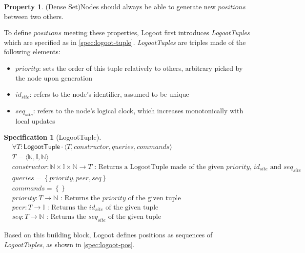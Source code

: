 \documentclass{article}
\newcommand{\commands}[1]{commands = \set{#1}}
\newcommand{\fnspec}[3]{#1: #2 \text{ : #3}}
\newcommand{\queries}[1]{queries = \set{#1}}
\newcommand{\set}[1]{\left\{#1\right\}} %
\newcommand{\spectuple}[1]{\tuple{#1, constructor, queries, commands}}
\newcommand{\tuple}[1]{\langle #1 \rangle}
\theoremstyle{definition}
\theoremstyle{definition}
\newcounter{property-counter}
\theoremstyle{definition}
\newtheorem{property}[property-counter]{Property}
\newcounter{specificationcounter}
\theoremstyle{definition}
\newtheorem{specification}[specificationcounter]{Specification}
\begin{document}
\begin{property}(Dense Set)\label{prop:dense-set}
    Nodes should always be able to generate new $positions$ between two others.
\end{property}

To define $positions$ meeting these properties, Logoot first introduces \emph{LogootTuples} which are specified as in \autoref{spec:logoot-tuple}.
\emph{LogootTuples} are triples made of the following elements:
\begin{itemize}
    \item $priority$: sets the order of this tuple relatively to others, arbitrary picked by the node upon generation
    \item $id_{site}$: refers to the node's identifier, assumed to be unique
    \item $seq_{site}$: refers to the node's logical clock, which increases monotonically with local updates
\end{itemize}

\begin{specification}[LogootTuple]
    \begin{align*}
    &\forall T: \mathsf{LogootTuple} \cdot \spectuple{T}\\
    &T = \tuple{\mathbb{N}, \mathbb{I}, \mathbb{N}}\\
    &\fnspec{constructor}{\mathbb{N} \times \mathbb{I} \times \mathbb{N} \to T}{Returns a LogootTuple made of the given $priority$, $id_{site}$ and $seq_{site}$}\\
    &\queries{priority, peer, seq}\\
    &\commands{}\\
    &\fnspec{priority}{T \to \mathbb{N}}{Returns the $priority$ of the given tuple}\\
    &\fnspec{peer}{T \to \mathbb{I}}{Returns the $id_{site}$ of the given tuple}\\
    &\fnspec{seq}{T \to \mathbb{N}}{Returns the $seq_{site}$ of the given tuple}
    \end{align*}
    \label{spec:logoot-tuple}
\end{specification}

Based on this building block, Logoot defines positions as sequences of \emph{LogootTuples}, as shown in \autoref{spec:logoot-pos}.
\end{document}
